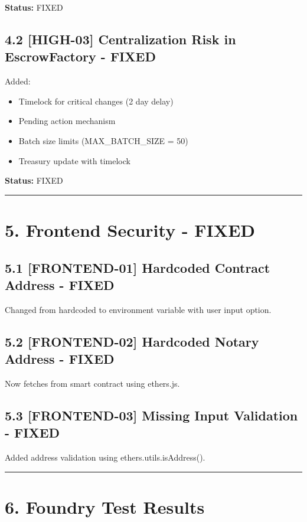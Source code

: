 \documentclass[12pt,a4paper]{article}
\begin{document}
\bigskip
\textbf{Status:} FIXED

\bigskip

\subsection*{4.2 [HIGH-03] Centralization Risk in EscrowFactory - FIXED}

Added:
\begin{itemize}
    \item Timelock for critical changes (2 day delay)
    \item Pending action mechanism
    \item Batch size limits (MAX\_BATCH\_SIZE = 50)
    \item Treasury update with timelock
\end{itemize}

\bigskip
\textbf{Status:} FIXED

\bigskip
\hrule

\section*{5. Frontend Security - FIXED}

\subsection*{5.1 [FRONTEND-01] Hardcoded Contract Address - FIXED}

Changed from hardcoded to environment variable with user input option.

\bigskip

\subsection*{5.2 [FRONTEND-02] Hardcoded Notary Address - FIXED}

Now fetches from smart contract using ethers.js.

\bigskip

\subsection*{5.3 [FRONTEND-03] Missing Input Validation - FIXED}

Added address validation using ethers.utils.isAddress().

\bigskip
\hrule

\section*{6. Foundry Test Results}
\end{document}
